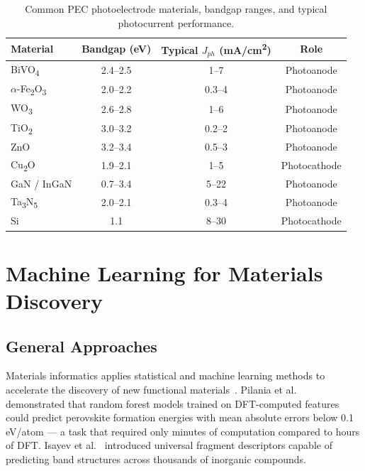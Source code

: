 \begin{table}[htb]
\centering
\caption{Common PEC photoelectrode materials, bandgap ranges, and typical
         photocurrent performance.}
\label{tab:materials}
\begin{tabular}{p{3.8cm}ccc}
\toprule
Material & Bandgap (eV) & Typical $J_{ph}$ (mA/cm\textsuperscript{2}) & Role \\
\midrule
BiVO\textsubscript{4}       & 2.4--2.5 & 1--7   & Photoanode  \\
$\alpha$-Fe\textsubscript{2}O\textsubscript{3} & 2.0--2.2 & 0.3--4 & Photoanode \\
WO\textsubscript{3}         & 2.6--2.8 & 1--6   & Photoanode  \\
TiO\textsubscript{2}        & 3.0--3.2 & 0.2--2 & Photoanode  \\
ZnO                         & 3.2--3.4 & 0.5--3 & Photoanode  \\
Cu\textsubscript{2}O        & 1.9--2.1 & 1--5   & Photocathode \\
GaN / InGaN                 & 0.7--3.4 & 5--22  & Photoanode  \\
Ta\textsubscript{3}N\textsubscript{5} & 2.0--2.1 & 0.3--4 & Photoanode \\
Si                          & 1.1      & 8--30  & Photocathode \\
\bottomrule
\end{tabular}
\end{table}

\section{Machine Learning for Materials Discovery}

\subsection{General Approaches}

Materials informatics applies statistical and machine learning methods to accelerate
the discovery of new functional materials~\cite{ramprasad2017machine}.
Pilania et al.~\cite{pilania2013accelerating} demonstrated that random forest models
trained on DFT-computed features could predict perovskite formation energies with
mean absolute errors below 0.1\,eV/atom --- a task that required only minutes of
computation compared to hours of DFT.
Isayev et al.~\cite{isayev2017universal} introduced universal fragment descriptors
capable of predicting band structures across thousands of inorganic compounds.

